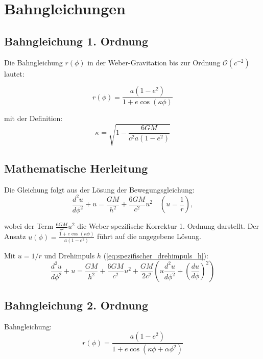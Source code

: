 \section{Bahngleichungen}
\subsection{Bahngleichung 1. Ordnung}
Die Bahngleichung \(r(\phi)\) in der Weber-Gravitation bis zur Ordnung \(\mathcal{O}(c^{-2})\) lautet:

\begin{equation}
\label{eq:bahngleichung_1_ordnung}
r(\phi) = \frac{a(1 - e^2)}{1 + e \cos\left(\kappa\phi\right)}
\end{equation}

\noindent mit der Definition:
\begin{equation}
\label{eq:kappa_1_ordnung}
\kappa = \sqrt{1 - \frac{6GM}{c^2a(1 - e^2)}}
\end{equation}

\subsection*{Mathematische Herleitung}
Die Gleichung folgt aus der Lösung der Bewegungsgleichung:
\begin{equation}
\frac{d^2u}{d\phi^2} + u = \frac{GM}{h^2} + \frac{6GM}{c^2} u^2 \quad \left(u = \frac{1}{r}\right),
\end{equation}

wobei der Term \(\frac{6GM}{c^2} u^2\) die Weber-spezifische Korrektur 1. Ordnung darstellt. Der Ansatz \(u(\phi) = \frac{1 + e \cos(\kappa\phi)}{a(1 - e^2)}\) führt auf die angegebene Lösung.

Mit $u=1/r$ und Drehimpuls $h$ (\ref{eq:spezifischer_drehimpuls_h}):
\begin{equation}
\frac{d^2u}{d\phi^2} + u = \frac{GM}{h^2} + \frac{6GM}{c^2}u^2 + \frac{GM}{2c^2}\left(u\frac{d^2u}{d\phi^2} + \left(\frac{du}{d\phi}\right)^2\right)
\end{equation}

\subsection{Bahngleichung 2. Ordnung}
Bahngleichung:
\begin{equation}
\label{eq:bahngleichung_2_ordnung}
    \boxed
    {
        r(\phi) = \frac{a(1-e^2)}{1 + e\cos\left(\kappa\phi + \alpha\phi^2\right)}
    }
\end{equation}

